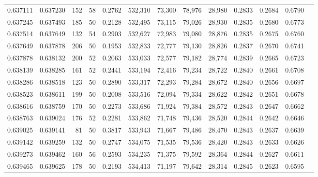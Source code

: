 \begin{tabular}{rrrrrrrrrrrrr}
0.637111 & 0.637230 &   152 &  58 &                                     0.2762 & 532,310 &  73,300 &  78,976 &  28,980 & 0.2833 & 0.2684 & 0.6790 \\
0.637245 & 0.637493 &   185 &  50 &                                     0.2128 & 532,495 &  73,115 &  79,026 &  28,930 & 0.2835 & 0.2680 & 0.6773 \\
0.637514 & 0.637649 &   132 &  54 &                                     0.2903 & 532,627 &  72,983 &  79,080 &  28,876 & 0.2835 & 0.2675 & 0.6760 \\
0.637649 & 0.637878 &   206 &  50 &                                     0.1953 & 532,833 &  72,777 &  79,130 &  28,826 & 0.2837 & 0.2670 & 0.6741 \\
0.637878 & 0.638132 &   200 &  52 &                                     0.2063 & 533,033 &  72,577 &  79,182 &  28,774 & 0.2839 & 0.2665 & 0.6723 \\
0.638139 & 0.638285 &   161 &  52 &                                     0.2441 & 533,194 &  72,416 &  79,234 &  28,722 & 0.2840 & 0.2661 & 0.6708 \\
0.638286 & 0.638518 &   123 &  50 &                                     0.2890 & 533,317 &  72,293 &  79,284 &  28,672 & 0.2840 & 0.2656 & 0.6697 \\
0.638523 & 0.638611 &   199 &  50 &                                     0.2008 & 533,516 &  72,094 &  79,334 &  28,622 & 0.2842 & 0.2651 & 0.6678 \\
0.638616 & 0.638759 &   170 &  50 &                                     0.2273 & 533,686 &  71,924 &  79,384 &  28,572 & 0.2843 & 0.2647 & 0.6662 \\
0.638763 & 0.639024 &   176 &  52 &                                     0.2281 & 533,862 &  71,748 &  79,436 &  28,520 & 0.2844 & 0.2642 & 0.6646 \\
0.639025 & 0.639141 &    81 &  50 &                                     0.3817 & 533,943 &  71,667 &  79,486 &  28,470 & 0.2843 & 0.2637 & 0.6639 \\
0.639142 & 0.639259 &   132 &  50 &                                     0.2747 & 534,075 &  71,535 &  79,536 &  28,420 & 0.2843 & 0.2633 & 0.6626 \\
0.639273 & 0.639462 &   160 &  56 &                                     0.2593 & 534,235 &  71,375 &  79,592 &  28,364 & 0.2844 & 0.2627 & 0.6611 \\
0.639465 & 0.639625 &   178 &  50 &                                     0.2193 & 534,413 &  71,197 &  79,642 &  28,314 & 0.2845 & 0.2623 & 0.6595 \\

\end{tabular}
